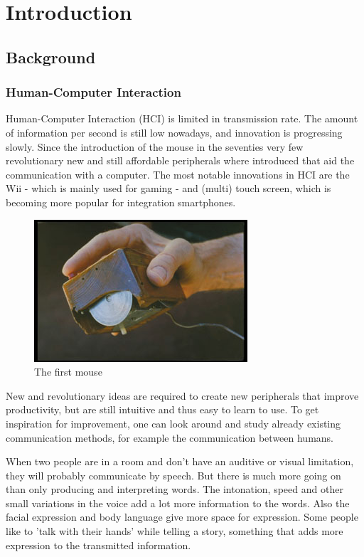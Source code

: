 
\chapter{Introduction}
\label{ch:intro}

\section{Background}
\subsection*{Human-Computer Interaction}
Human-Computer Interaction (HCI) is limited in transmission rate. The amount of information per second is still low nowadays, and innovation is progressing slowly. Since the introduction of the mouse in the seventies very few revolutionary new and still affordable peripherals where introduced that aid the communication with a computer. The most notable innovations in HCI are the Wii - which is mainly used for gaming - and (multi) touch screen, which is becoming more popular for integration smartphones.

\begin{figure}[htbp]
	\center{}
	\label{fig:mouse}
	\includegraphics[width=0.3\linewidth]{figures/mouse.jpg}
	\caption{The first mouse}
\end{figure}

New and revolutionary ideas are required to create new peripherals that improve productivity, but are still intuitive and thus easy to learn to use. To get inspiration for improvement, one can look around and study already existing communication methods, for example the communication between humans. 

When two people are in a room and don't have an auditive or visual limitation, they will probably communicate by speech. But there is much more going on than only producing and interpreting words. The intonation, speed and other small variations in the voice add a lot more information to the words. Also the facial expression and body language give more space for expression. Some people like to 'talk with their hands' while telling a story, something that adds more expression to the transmitted information.

